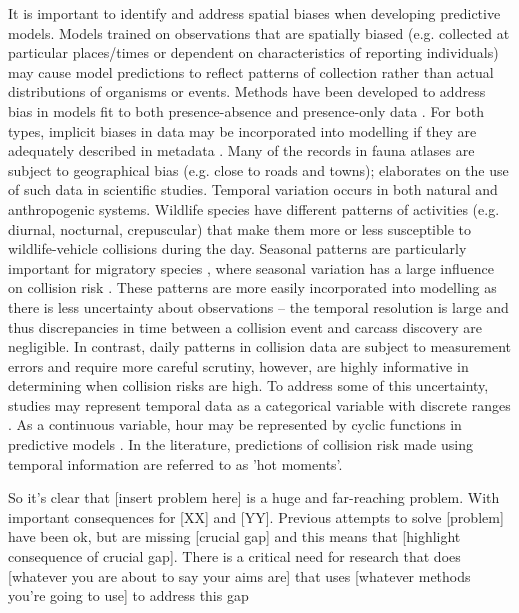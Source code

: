 It is important to identify and address spatial biases when developing predictive models. Models trained on observations that are spatially biased (e.g. collected at particular places/times or dependent on characteristics of reporting individuals) may cause model predictions to reflect patterns of collection rather than actual distributions of organisms or events. Methods have been developed to address bias in models fit to both presence-absence \citep{hijm12} and presence-only data \citep{kram13}. For both types, implicit biases in data may be incorporated into modelling if they are adequately described in metadata \citep{wart13}. Many of the records in fauna atlases are subject to geographical bias (e.g. close to roads and towns); \cite{grah04} elaborates on the use of such data in scientific studies.
Temporal variation occurs in both natural and anthropogenic systems. Wildlife species have different patterns of activities (e.g. diurnal, nocturnal, crepuscular) that make them more or less susceptible to wildlife-vehicle collisions during the day. Seasonal patterns are particularly important for migratory species \citep{hick85,bern92}, where seasonal variation has a large influence on collision risk \citep{shep08}. These patterns are more easily incorporated into modelling as there is less uncertainty about observations -- the temporal resolution is large and thus discrepancies in time between a collision event and carcass discovery are negligible. In contrast, daily patterns in collision data are subject to measurement errors and require more careful scrutiny, however, are highly informative in determining when collision risks are high. To address some of this uncertainty, studies may represent temporal data as a categorical variable \citep{mizu14} with discrete ranges \citep{rowd08}. As a continuous variable, hour may be represented by cyclic functions in predictive models \citep{neum12,thur15}. In the literature, predictions of collision risk made using temporal information are referred to as 'hot moments'.

So it's clear that [insert problem here] is a huge and far-reaching problem. With important consequences for [XX] and [YY]. Previous attempts to solve [problem] have been ok, but are missing [crucial gap] and this means that [highlight consequence of crucial gap]. There is a critical need for research that does [whatever you are about to say your aims are] that uses [whatever methods you're going to use] to address this gap

